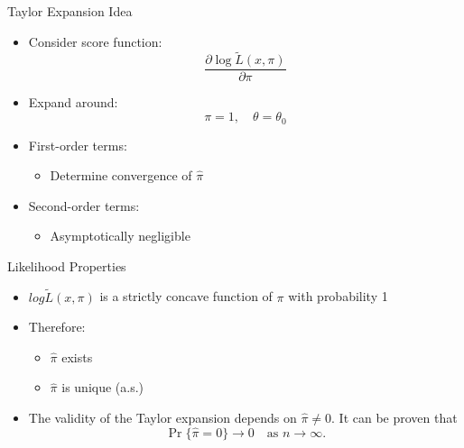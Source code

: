 \begin{frame}{Taylor Expansion Idea}
\begin{itemize}
    \item Consider score function:
    \[
    \frac{\partial \log \tilde L(x,\pi)}{\partial \pi}
    \]

    \item Expand around:
    \[
    \pi = 1, \quad \theta = \theta_0
    \]

    \item First-order terms:
    \begin{itemize}
        \item Determine convergence of $\hat{\pi}$
    \end{itemize}

    \item Second-order terms:
    \begin{itemize}
        \item Asymptotically negligible
    \end{itemize}
\end{itemize}
\end{frame}


\begin{frame}{Likelihood Properties}
\begin{itemize}
    \item $log \tilde L(x, \pi)$ is a strictly concave function of $\pi$ with probability 1

    \item Therefore:
    \begin{itemize}
        \item $\hat{\pi}$ exists
        \item $\hat{\pi}$ is unique (a.s.)
    \end{itemize}

    
    \item The validity of the Taylor expansion depends on $\hat{\pi} \neq 0$. 
It can be proven that 
\[
\Pr\{\hat{\pi} = 0\} \to 0 \quad \text{as } n \to \infty.
\]
\end{itemize}
\end{frame}


